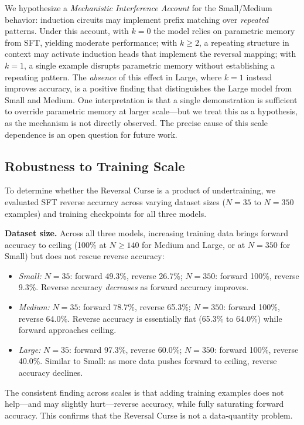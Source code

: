 \documentclass[11pt]{article}
\begin{document}
We hypothesize a \emph{Mechanistic Interference Account} for the Small/Medium
behavior: induction circuits may implement prefix matching over \emph{repeated}
patterns. Under this account, with $k=0$ the model relies on parametric memory
from SFT, yielding moderate performance; with $k \geq 2$, a repeating structure
in context may activate induction heads that implement the reversal mapping; with
$k=1$, a single example disrupts parametric memory without establishing a
repeating pattern. The \emph{absence} of this effect in Large, where $k=1$
instead improves accuracy, is a positive finding that distinguishes the Large
model from Small and Medium. One interpretation is that a single demonstration
is sufficient to override parametric memory at larger scale---but we treat this
as a hypothesis, as the mechanism is not directly observed. The precise cause of
this scale dependence is an open question for future work.

\subsection{Robustness to Training Scale}
\label{sec:robustness}

To determine whether the Reversal Curse is a product of undertraining, we
evaluated SFT reverse accuracy across varying dataset sizes ($N = 35$ to
$N = 350$ examples) and training checkpoints for all three models.

\textbf{Dataset size.} Across all three models, increasing training data brings
forward accuracy to ceiling (100\% at $N \geq 140$ for Medium and Large, or at
$N = 350$ for Small) but does not rescue reverse accuracy:
\begin{itemize}
  \item \textit{Small:} $N=35$: forward 49.3\%, reverse 26.7\%; $N=350$: forward
  100\%, reverse 9.3\%. Reverse accuracy \emph{decreases} as forward accuracy
  improves.
  \item \textit{Medium:} $N=35$: forward 78.7\%, reverse 65.3\%; $N=350$:
  forward 100\%, reverse 64.0\%. Reverse accuracy is essentially flat (65.3\%
  to 64.0\%) while forward approaches ceiling.
  \item \textit{Large:} $N=35$: forward 97.3\%, reverse 60.0\%; $N=350$:
  forward 100\%, reverse 40.0\%. Similar to Small: as more data pushes forward
  to ceiling, reverse accuracy declines.
\end{itemize}

The consistent finding across scales is that adding training examples does not
help---and may slightly hurt---reverse accuracy, while fully saturating forward
accuracy. This confirms that the Reversal Curse is not a data-quantity problem.
\end{document}
